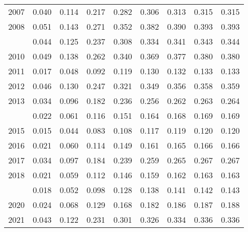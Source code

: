 \documentclass[
]{article}
\begin{document}
\begin{longtable}[t]{lrrrrrrrr}
2007 & 0.040 & 0.114 & 0.217 & 0.282 & 0.306 & 0.313 & 0.315 & 0.315\\
2008 & 0.051 & 0.143 & 0.271 & 0.352 & 0.382 & 0.390 & 0.393 & 0.393\\
\addlinespace
2009 & 0.044 & 0.125 & 0.237 & 0.308 & 0.334 & 0.341 & 0.343 & 0.344\\
2010 & 0.049 & 0.138 & 0.262 & 0.340 & 0.369 & 0.377 & 0.380 & 0.380\\
2011 & 0.017 & 0.048 & 0.092 & 0.119 & 0.130 & 0.132 & 0.133 & 0.133\\
2012 & 0.046 & 0.130 & 0.247 & 0.321 & 0.349 & 0.356 & 0.358 & 0.359\\
2013 & 0.034 & 0.096 & 0.182 & 0.236 & 0.256 & 0.262 & 0.263 & 0.264\\
\addlinespace
2014 & 0.022 & 0.061 & 0.116 & 0.151 & 0.164 & 0.168 & 0.169 & 0.169\\
2015 & 0.015 & 0.044 & 0.083 & 0.108 & 0.117 & 0.119 & 0.120 & 0.120\\
2016 & 0.021 & 0.060 & 0.114 & 0.149 & 0.161 & 0.165 & 0.166 & 0.166\\
2017 & 0.034 & 0.097 & 0.184 & 0.239 & 0.259 & 0.265 & 0.267 & 0.267\\
2018 & 0.021 & 0.059 & 0.112 & 0.146 & 0.159 & 0.162 & 0.163 & 0.163\\
\addlinespace
2019 & 0.018 & 0.052 & 0.098 & 0.128 & 0.138 & 0.141 & 0.142 & 0.143\\
2020 & 0.024 & 0.068 & 0.129 & 0.168 & 0.182 & 0.186 & 0.187 & 0.188\\
2021 & 0.043 & 0.122 & 0.231 & 0.301 & 0.326 & 0.334 & 0.336 & 0.336\\*
\end{longtable}
\end{document}
